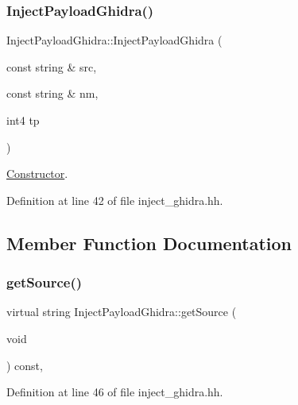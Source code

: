 \subsubsection{\texorpdfstring{InjectPayloadGhidra()}{InjectPayloadGhidra()}}
{\footnotesize\ttfamily Inject\+Payload\+Ghidra\+::\+Inject\+Payload\+Ghidra (\begin{DoxyParamCaption}\item[{const string \&}]{src,  }\item[{const string \&}]{nm,  }\item[{int4}]{tp }\end{DoxyParamCaption})\hspace{0.3cm}{\ttfamily [inline]}}



\mbox{\hyperlink{class_constructor}{Constructor}}. 



Definition at line 42 of file inject\+\_\+ghidra.\+hh.



\subsection{Member Function Documentation}
\mbox{\label{class_inject_payload_ghidra_a711ab66b629aec4c756751bd737c7580}} 
\subsubsection{\texorpdfstring{getSource()}{getSource()}}
{\footnotesize\ttfamily virtual string Inject\+Payload\+Ghidra\+::get\+Source (\begin{DoxyParamCaption}\item[{void}]{ }\end{DoxyParamCaption}) const\hspace{0.3cm}{\ttfamily [inline]}, {\ttfamily [virtual]}}



Definition at line 46 of file inject\+\_\+ghidra.\+hh.

\mbox{\label{class_inject_payload_ghidra_ad6f4913cfcdd2eaf229a45150802250c}} 
